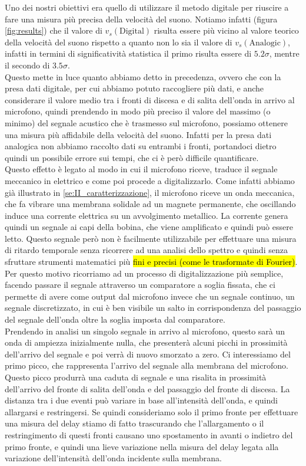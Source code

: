 \documentclass[
    rmp,
    reprint, 
    superscriptaddress, 
    altaffilletter, 
    amsmath, 
    amssymb, 
    a4paper,
    varvw]{revtex4-2}
\begin{document}
Uno dei nostri obiettivi era quello di utilizzare il metodo digitale per riuscire a fare una misura più precisa della velocità del suono. Notiamo infatti (figura \ref{fig:results}) che il valore di $v_s(\text{Digital})$ risulta essere più vicino al valore teorico della velocità del suono rispetto a quanto non lo sia il valore di $v_s(\text{Analogic})$, infatti in termini di significatività statistica il primo risulta essere di $5.2\sigma$, mentre il secondo di $3.5\sigma$. \\
Questo mette in luce quanto abbiamo detto in precedenza, ovvero che con la presa dati digitale, per cui abbiamo potuto raccogliere più dati, e anche considerare il valore medio tra i fronti di discesa e di salita dell'onda in arrivo al microfono, quindi prendendo in modo più preciso il valore del massimo (o minimo) del segnale acustico che è trasmesso sul microfono, possiamo ottenere una misura più affidabile della velocità del suono. Infatti per la presa dati analogica non abbiamo raccolto dati su entrambi i fronti, portandoci dietro quindi un possibile errore sui tempi, che ci è però difficile quantificare. \\
Questo effetto è legato al modo in cui il microfono riceve, traduce il segnale meccanico in elettrico e come poi procede a digitalizzarlo. Come infatti abbiamo già illustrato in \ref{se:II_caratterizzazione}, il microfono riceve un onda meccanica, che fa vibrare una membrana solidale ad un magnete permanente, che oscillando induce una corrente elettrica su un avvolgimento metallico. La corrente genera quindi un segnale ai capi della bobina, che viene amplificato e quindi può essere letto. Questo segnale però non è facilmente utilizzabile per effettuare una misura di ritardo temporale senza ricorrere ad una analisi dello spettro e quindi senza sfruttare strumenti matematici più \hl{fini e precisi (come le trasformate di Fourier)}. Per questo motivo ricorriamo ad un processo di digitalizzazione più semplice, facendo passare il segnale attraverso un comparatore a soglia fissata, che ci permette di avere come output dal microfono invece che un segnale continuo, un segnale discretizzato, in cui è ben visibile un salto in corrispondenza del passaggio del segnale dell'onda oltre la soglia imposta dal comparatore. \\
Prendendo in analisi un singolo segnale in arrivo al microfono, questo sarà un onda di ampiezza inizialmente nulla, che presenterà alcuni picchi in prossimità dell'arrivo del segnale e poi verrà di nuovo smorzato a zero. Ci interessiamo del primo picco, che rappresenta l'arrivo del segnale alla membrana del microfono. Questo picco produrrà una caduta di segnale e una risalita in prossimità dell'arrivo del fronte di salita dell'onda e del passaggio del fronte di discesa. La distanza tra i due eventi può variare in base all'intensità dell'onda, e quindi allargarsi e restringersi. Se quindi consideriamo solo il primo fronte per effettuare una misura del delay stiamo di fatto trascurando che l'allargamento o il restringimento di questi fronti causano uno spostamento in avanti o indietro del primo fronte, e quindi una lieve variazione nella misura del delay legata alla variazione dell'intensità dell'onda incidente sulla membrana. \\
\end{document}
